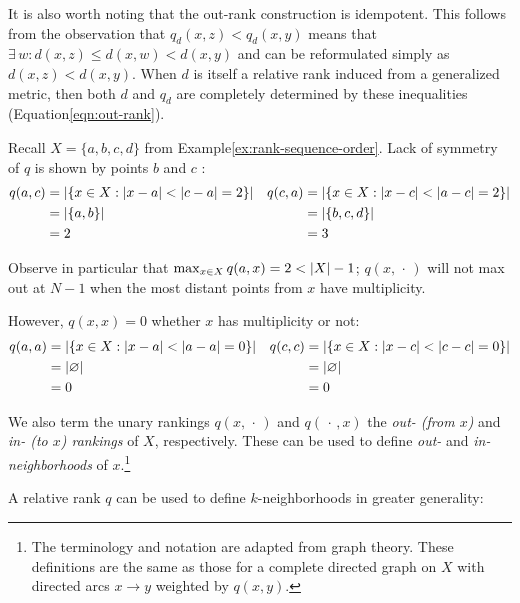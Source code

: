 \documentclass{article}
\begin{document}
It is also worth noting that the out-rank construction is idempotent.
This follows from the observation that \(q_d(x,z) < q_d(x,y)\) means
that \(\exists\, w : d(x,z) \leq d(x,w) < d(x,y)\) and can be
reformulated simply as \(d(x,z) < d(x,y)\). When \(d\) is itself a
relative rank induced from a generalized metric, then both \(d\) and
\(q_d\) are completely determined by these inequalities
(Equation\nbs\ref{eqn:out-rank}).

\begin{example}\label{ex:relative-rank}
    Recall $X=\{a,b,c,d\}$ from Example\nbs\ref{ex:rank-sequence-order}.
    Lack of symmetry of $q$ is shown by points $b$ and $c$ :
    \begin{align*}
        q(a,c) &= \lvert \{x \in X : \lvert x-a\rvert < \lvert c-a\rvert = 2\}\rvert &
        q(c,a) &= \lvert \{x \in X : \lvert x-c\rvert < \lvert a-c\rvert = 2\}\rvert \\
               &= \lvert \{a, b\}\rvert &&= \lvert \{b, c, d\}\rvert \\
               &= 2 &&= 3
    \end{align*}

    Observe in particular that $\max_{x\in X}{q(a,x)}=2<\lvert X\rvert-1$; $q(x,\,\cdot\,)$ will not max out at $N-1$ when the most distant points from $x$ have multiplicity.

    However, $q(x,x) = 0$ whether $x$ has multiplicity or not:
    \begin{align*}
        q(a,a) &= \lvert \{x \in X : \lvert x-a\rvert < \lvert a-a\rvert = 0\}\rvert &
        q(c,c) &= \lvert \{x \in X : \lvert x-c\rvert < \lvert c-c\rvert = 0\}\rvert \\
               &= \lvert \varnothing\rvert &&= \lvert \varnothing\rvert \\
               &= 0 &&= 0
    \end{align*}
\end{example}

We also term the unary rankings \(q(x,\,\cdot\,)\) and
\(q(\,\cdot\,,x)\) the \emph{out- (from $x$)} and
\emph{in- (to $x$) rankings} of \(X\), respectively. These can be used
to define \emph{out-} and \emph{in-neighborhoods} of \(x\).\footnote{The
  terminology and notation are adapted from graph theory. These
  definitions are the same as those for a complete directed graph on
  \(X\) with directed arcs \(x\to y\) weighted by \(q(x,y)\).}

A relative rank \(q\) can be used to define \(k\)-neighborhoods in
greater generality:
\end{document}
